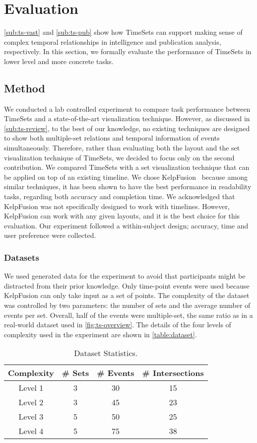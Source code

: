 \section{Evaluation}
\autoref{sub:ts-vast} and \autoref{sub:ts-pub} show how TimeSets can support making sense of complex temporal relationships in intelligence and publication analysis, respectively. In this section, we formally evaluate the performance of TimeSets in lower level and more concrete tasks.

\subsection{Method}
We conducted a lab controlled experiment to compare task performance between TimeSets and a state-of-the-art visualization technique. However, as discussed in \autoref{sub:ts-review}, to the best of our knowledge, no existing techniques are designed to show both multiple-set relations and temporal information of events simultaneously. Therefore, rather than evaluating both the layout and the set visualization technique of TimeSets, we decided to focus only on the second contribution. We compared TimeSets with a set visualization technique that can be applied on top of an existing timeline. We chose KelpFusion~\cite{Meulemans2013} because among similar techniques, it has been shown to have the best performance in readability tasks, regarding both accuracy and completion time. We acknowledged that KelpFusion was not specifically designed to work with timelines. However, KelpFusion can work with any given layouts, and it is the best choice for this evaluation. Our experiment followed a within-subject design; accuracy, time and user preference were collected.

\subsubsection{Datasets}
We used generated data for the experiment to avoid that participants might be distracted from their prior knowledge. Only time-point events were used because KelpFusion can only take input as a set of points. The complexity of the dataset was controlled by two parameters: the number of sets and the average number of events per set. Overall, half of the events were multiple-set, the same ratio as in a real-world dataset used in \autoref{fig:ts-overview}. The details of the four levels of complexity used in the experiment are shown in \autoref{table:dataset}.

\begin{table}[!htb]
\centering
\sffamily\small
\caption{Dataset Statistics.}
\label{table:dataset}
\begin{tabular}{cccc}
	\toprule
	\textbf{Complexity} & \textbf{\# Sets} & \textbf{\# Events} & \textbf{\# Intersections} \\
	\midrule
	Level 1 & 3 & 30 & 15 \\
	Level 2 & 3 & 45 & 23 \\
	Level 3 & 5 & 50 & 25 \\
	Level 4 & 5 & 75 & 38 \\
	\bottomrule
\end{tabular}
\end{table}

